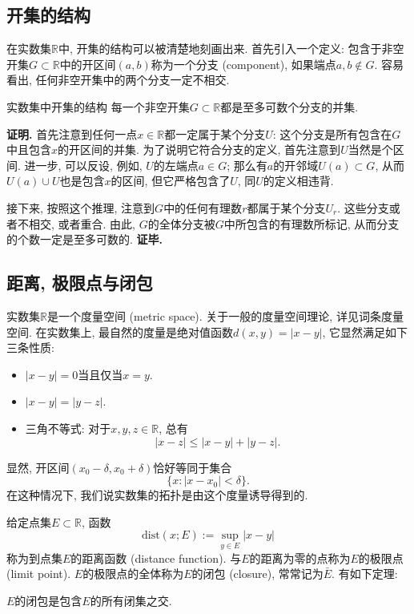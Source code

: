 \subsection{开集的结构}
在实数集$\mathbb{R}$中, 开集的结构可以被清楚地刻画出来. 首先引入一个定义: 包含于非空开集$G\subset\mathbb{R}$中的开区间$(a,b)$称为一个分支 (component), 如果端点$a,b\notin G$. 容易看出, 任何非空开集中的两个分支一定不相交.

\begin{theorem}{实数集中开集的结构}
每一个非空开集$G\subset\mathbb{R}$都是至多可数个分支的并集. 
\end{theorem}
\textbf{证明.} 首先注意到任何一点$x\in\mathbb{R}$都一定属于某个分支$U$: 这个分支是所有包含在$G$中且包含$x$的开区间的并集. 为了说明它符合分支的定义, 首先注意到$U$当然是个区间. 进一步, 可以反设, 例如, $U$的左端点$a\in G$; 那么有$a$的开邻域$U(a)\subset G$, 从而$U(a)\cup U$也是包含$x$的区间, 但它严格包含了$U$, 同$U$的定义相违背.

接下来, 按照这个推理, 注意到$G$中的任何有理数$r$都属于某个分支$U_r$. 这些分支或者不相交, 或者重合. 由此, $G$的全体分支被$G$中所包含的有理数所标记, 从而分支的个数一定是至多可数的. \textbf{证毕.}

\subsection{距离, 极限点与闭包}
实数集$\mathbb{R}$是一个度量空间 (metric space). 关于一般的度量空间理论, 详见词条度量空间. 在实数集上, 最自然的度量是绝对值函数$d(x,y)=|x-y|$, 它显然满足如下三条性质:

\begin{itemize}
\item $|x-y|=0$当且仅当$x=y$.
\item $|x-y|=|y-z|$.
\item 三角不等式: 对于$x,y,z\in\mathbb{R}$, 总有
$$
|x-z|\leq|x-y|+|y-z|.
$$
\end{itemize}

显然, 开区间$(x_0-\delta,x_0+\delta)$恰好等同于集合
$$
\{x:|x-x_0|<\delta\}.
$$
在这种情况下, 我们说实数集的拓扑是由这个度量诱导得到的.

给定点集$E\subset\mathbb{R}$, 函数
$$
\text{dist}(x;E):=\sup_{y\in E}|x-y|
$$
称为到点集$E$的距离函数 (distance function). 与$E$的距离为零的点称为$E$的极限点 (limit point). $E$的极限点的全体称为$E$的闭包 (closure), 常常记为$\bar E$. 有如下定理:
\begin{theorem}{}
$E$的闭包是包含$E$的所有闭集之交.
\end{theorem}